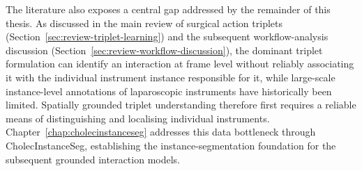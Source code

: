 The literature also exposes a central gap addressed by the remainder of this thesis. As discussed in the main review of surgical action triplets (Section~\ref{sec:review-triplet-learning}) and the subsequent workflow-analysis discussion (Section~\ref{sec:review-workflow-discussion}), the dominant triplet formulation can identify an interaction at frame level without reliably associating it with the individual instrument instance responsible for it, while large-scale instance-level annotations of laparoscopic instruments have historically been limited. Spatially grounded triplet understanding therefore first requires a reliable means of distinguishing and localising individual instruments. Chapter~\ref{chap:cholecinstanceseg} addresses this data bottleneck through CholecInstanceSeg, establishing the instance-segmentation foundation for the subsequent grounded interaction models.
